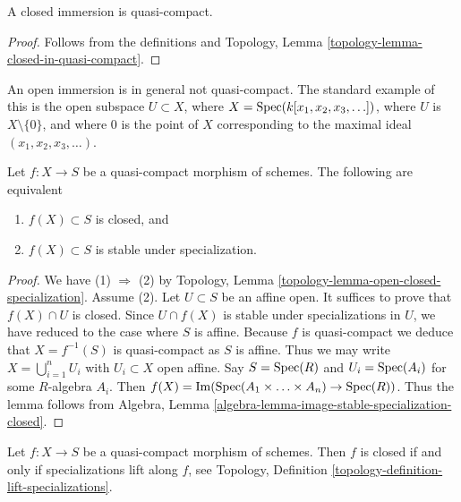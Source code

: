 \begin{lemma}
\label{lemma-closed-immersion-quasi-compact}
A closed immersion is quasi-compact.
\end{lemma}

\begin{proof}
Follows from the definitions and
Topology, Lemma \ref{topology-lemma-closed-in-quasi-compact}.
\end{proof}

\begin{example}
\label{example-open-immersion-not-quasi-compact}
An open immersion is in general not quasi-compact.
The standard example of this is the open subspace
$U \subset X$, where $X = \mathop{\mathrm{Spec}}(k[x_1, x_2, x_3, \ldots])$,
where $U$ is $X \setminus \{0\}$, and where $0$ is the point
of $X$ corresponding to the maximal ideal
$(x_1, x_2, x_3, \ldots)$.
\end{example}

\begin{lemma}
\label{lemma-image-quasi-compact-closed}
Let $f : X \to S$ be a quasi-compact morphism of schemes.
The following are equivalent
\begin{enumerate}
\item $f(X) \subset S$ is closed, and
\item $f(X) \subset S$ is stable under specialization.
\end{enumerate}
\end{lemma}

\begin{proof}
We have (1) $\Rightarrow$ (2) by
Topology, Lemma \ref{topology-lemma-open-closed-specialization}.
Assume (2). Let $U \subset S$ be an affine open. It suffices to prove
that $f(X) \cap U$ is closed. Since $U \cap f(X)$ is stable under
specializations in $U$, we have reduced to the case where $S$ is affine.
Because $f$ is quasi-compact we deduce that $X = f^{-1}(S)$ is
quasi-compact as $S$ is affine. Thus we may write
$X = \bigcup_{i = 1}^n U_i$ with $U_i \subset X$ open affine.
Say $S = \mathop{\mathrm{Spec}}(R)$ and
$U_i = \mathop{\mathrm{Spec}}(A_i)$ for some $R$-algebra $A_i$.
Then $f(X) = \mathop{\mathrm{Im}}(\mathop{\mathrm{Spec}}(A_1 \times \ldots \times A_n)
\to \mathop{\mathrm{Spec}}(R))$. Thus the lemma follows from
Algebra, Lemma \ref{algebra-lemma-image-stable-specialization-closed}.
\end{proof}

\begin{lemma}
\label{lemma-quasi-compact-closed}
Let $f : X \to S$ be a quasi-compact morphism of schemes.
Then $f$ is closed if and only if specializations lift
along $f$, see
Topology, Definition \ref{topology-definition-lift-specializations}.
\end{lemma}

